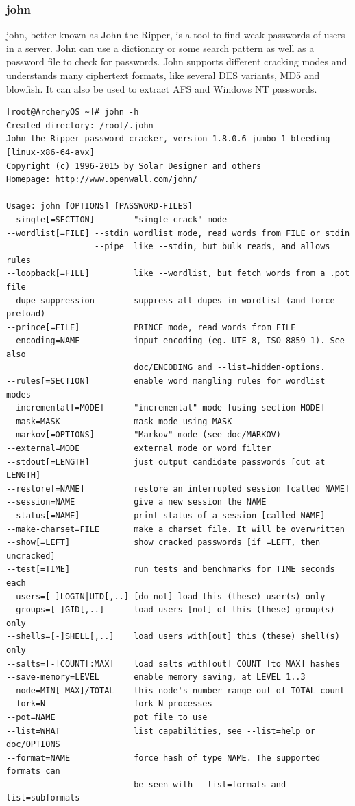 \documentclass{article}
\begin{document}
\subsubsection{john}
john, better known as John the Ripper, is a tool to find weak passwords of users in a server. John can use  a  dictionary or some search pattern as well as a password file to check for passwords. John supports different cracking modes and  understands  many  ciphertext  formats,  like  several DES variants, MD5 and blowfish. It can also be used to extract AFS and Windows NT passwords.
\begin{lstlisting}
[root@ArcheryOS ~]# john -h
Created directory: /root/.john
John the Ripper password cracker, version 1.8.0.6-jumbo-1-bleeding [linux-x86-64-avx]
Copyright (c) 1996-2015 by Solar Designer and others
Homepage: http://www.openwall.com/john/

Usage: john [OPTIONS] [PASSWORD-FILES]
--single[=SECTION]        "single crack" mode
--wordlist[=FILE] --stdin wordlist mode, read words from FILE or stdin
                  --pipe  like --stdin, but bulk reads, and allows rules
--loopback[=FILE]         like --wordlist, but fetch words from a .pot file
--dupe-suppression        suppress all dupes in wordlist (and force preload)
--prince[=FILE]           PRINCE mode, read words from FILE
--encoding=NAME           input encoding (eg. UTF-8, ISO-8859-1). See also
                          doc/ENCODING and --list=hidden-options.
--rules[=SECTION]         enable word mangling rules for wordlist modes
--incremental[=MODE]      "incremental" mode [using section MODE]
--mask=MASK               mask mode using MASK
--markov[=OPTIONS]        "Markov" mode (see doc/MARKOV)
--external=MODE           external mode or word filter
--stdout[=LENGTH]         just output candidate passwords [cut at LENGTH]
--restore[=NAME]          restore an interrupted session [called NAME]
--session=NAME            give a new session the NAME
--status[=NAME]           print status of a session [called NAME]
--make-charset=FILE       make a charset file. It will be overwritten
--show[=LEFT]             show cracked passwords [if =LEFT, then uncracked]
--test[=TIME]             run tests and benchmarks for TIME seconds each
--users=[-]LOGIN|UID[,..] [do not] load this (these) user(s) only
--groups=[-]GID[,..]      load users [not] of this (these) group(s) only
--shells=[-]SHELL[,..]    load users with[out] this (these) shell(s) only
--salts=[-]COUNT[:MAX]    load salts with[out] COUNT [to MAX] hashes
--save-memory=LEVEL       enable memory saving, at LEVEL 1..3
--node=MIN[-MAX]/TOTAL    this node's number range out of TOTAL count
--fork=N                  fork N processes
--pot=NAME                pot file to use
--list=WHAT               list capabilities, see --list=help or doc/OPTIONS
--format=NAME             force hash of type NAME. The supported formats can
                          be seen with --list=formats and --list=subformats
\end{lstlisting}
\end{document}
